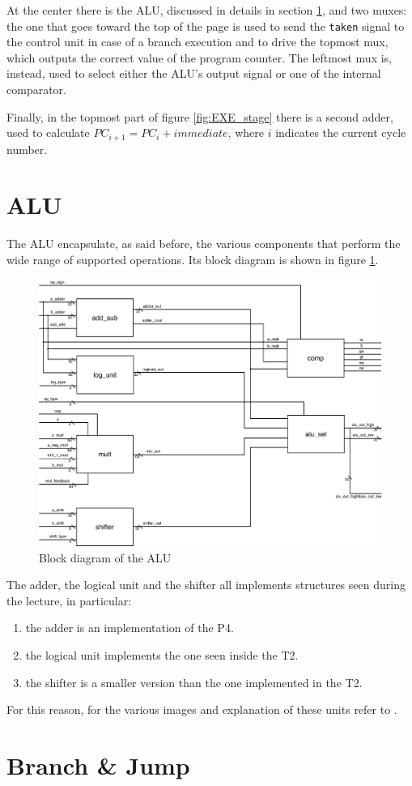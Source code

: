 At the center there is the ALU, discussed in details in section \ref{sec:alu}, and two muxes: the one that goes toward the top of the page is used to send
the \verb|taken| signal to the control unit in case of a branch execution and to drive the topmost mux, which outputs the correct value of the program counter.
The leftmost mux is, instead, used to select either the ALU's output signal or one of the internal comparator.

Finally, in the topmost part of figure \ref{fig:EXE_stage} there is a second adder, used to calculate $PC_{i+1} = PC_{i} + immediate$, where $i$ indicates the
current cycle number.

\section{ALU}
\label{sec:alu}

The ALU encapsulate, as said before, the various components that perform the wide range of supported operations. Its block diagram is shown in figure \ref{fig:alu}.

\begin{figure}[!ht]
	\centering
	\includegraphics[width=0.8\linewidth]{./chapters/figures/ALU_exe.pdf}
	\caption{Block diagram of the ALU}
	\label{fig:alu}
\end{figure}

The adder, the logical unit and the shifter all implements structures seen during the lecture, in particular:

\begin{enumerate}
    \item the adder is an implementation of the P4.
    \item the logical unit implements the one seen inside the T2.
    \item the shifter is a smaller version than the one implemented in the T2.
\end{enumerate}

For this reason, for the various images and explanation of these units refer to \cite{ln}. 

\section{Branch \& Jump}